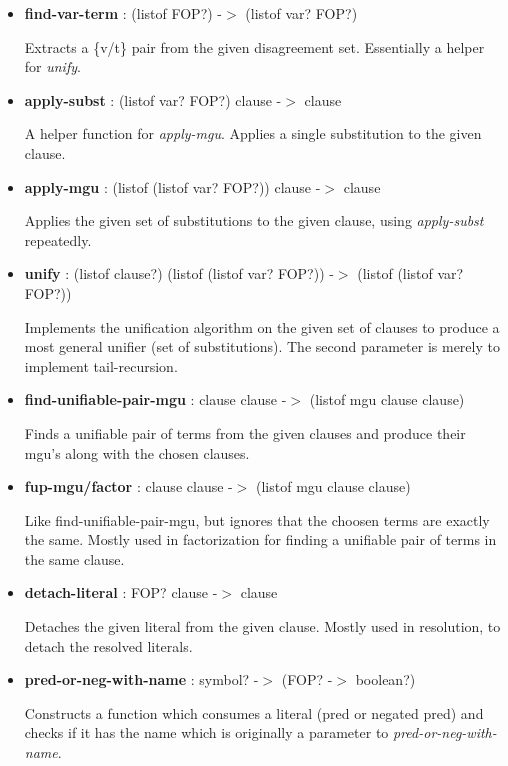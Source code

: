 \documentclass[11pt]{report}
\begin{document}
\begin{appendices}
\begin{itemize}
 \item \textbf{find-var-term} : (listof FOP?) -$>$ (listof var? FOP?)

Extracts a \{v/t\} pair from the given disagreement set. Essentially a helper for \textit{unify}.

 \item \textbf{apply-subst} : (listof var? FOP?) clause -$>$ clause

A helper function for \textit{apply-mgu}. Applies a single substitution to the given clause.

 \item \textbf{apply-mgu} : (listof (listof var? FOP?)) clause -$>$ clause

Applies the given set of substitutions to the given clause, using \textit{apply-subst} repeatedly.

 \item \textbf{unify} : (listof clause?) (listof (listof var? FOP?)) -$>$ (listof (listof var? FOP?))

Implements the unification algorithm on the given set of clauses to produce a most general unifier (set of substitutions). The second parameter is merely to implement tail-recursion.

 \item \textbf{find-unifiable-pair-mgu} : clause clause -$>$ (listof mgu clause clause)

Finds a unifiable pair of terms from the given clauses and produce their mgu's along with the chosen clauses.

 \item \textbf{fup-mgu/factor} : clause clause -$>$ (listof mgu clause clause)

Like find-unifiable-pair-mgu, but ignores that the choosen terms are exactly the same. Mostly used in factorization for finding a unifiable pair of terms in the same clause.

 \item \textbf{detach-literal} : FOP? clause -$>$ clause

Detaches the given literal from the given clause. Mostly used in resolution, to detach the resolved literals.

 \item \textbf{pred-or-neg-with-name} : symbol? -$>$ (FOP? -$>$ boolean?)

Constructs a function which consumes a literal (pred or negated pred) and checks if it has the name which is originally a parameter to \textit{pred-or-neg-with-name}.


\end{itemize}
\end{appendices}
\end{document}
